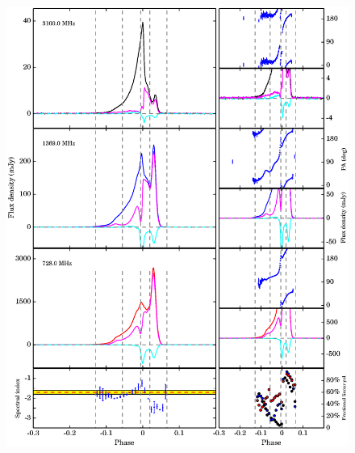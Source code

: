 \documentclass[useAMS,usenatbib]{mn2e}
\begin{document}
\begin{figure}
\begin{center}
\includegraphics[width=7 in]{1022.ps}
\end{center}
\end{figure}
\end{document}
